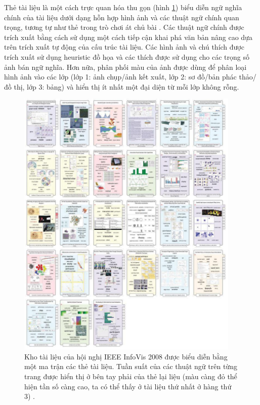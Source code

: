 \documentclass[14pt, a4paper]{article}
\numberwithin{equation}{section}
\numberwithin{figure}{section}
\numberwithin{dl}{section}
\numberwithin{md}{section}
\numberwithin{bd}{section}
\numberwithin{dn}{section}
\numberwithin{hq}{section}
\begin{document}
    Thẻ tài liệu là một cách trực quan hóa thu gọn (hình \ref{fig:12}) biểu diễn ngữ nghĩa chính của tài liệu dưới dạng hỗn hợp hình ảnh và các thuật ngữ chính quan trọng, tương tự như thẻ trong trò chơi át chủ bài \cite{400}.
    Các thuật ngữ chính được trích xuất bằng cách sử dụng một cách tiếp cận khai phá văn bản nâng cao dựa trên trích xuất tự động của cấu trúc tài liệu.
    Các hình ảnh và chú thích được trích xuất sử dụng heuristic đồ họa và các thích được sử dụng cho các trọng số ảnh bán ngữ nghĩa.
    Hơn nữa, phân phối màu của ảnh được dùng để phân loại hình ảnh vào các lớp (lớp 1: ảnh chụp/ảnh kết xuất, lớp 2: sơ đồ/bản phác thảo/đồ thị, lớp 3: bảng) và hiển thị ít nhất một đại diện từ mỗi lớp không rỗng.

    \begin{figure}[h!]
        \centering
        \includegraphics[width=0.95\textwidth]{12.png}
        \caption{Kho tài liệu của hội nghị IEEE InfoVis 2008 được biểu diễn bằng một ma trận các thẻ tài liệu.
        Tuần suất của các thuật ngữ trên từng trang được hiển thị ở bên tay phải của thẻ lại liệu (màu càng đỏ thể hiện tần số càng cao, ta có thể thấy ở tài liệu thứ nhất ở hàng thứ 3) \cite{400}.}
        \label{fig:12}
    \end{figure}
\end{document}
